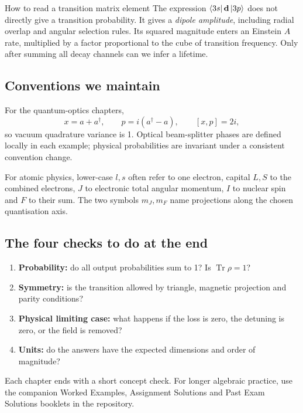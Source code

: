 \begin{worked}{How to read a transition matrix element}
The expression
\(\left\langle 3s\right\rvert\mathbf d\left\lvert 3p\right\rangle\)
does not directly give a transition
probability. It gives a \emph{dipole
amplitude}, including radial overlap
and angular selection rules.
Its squared magnitude enters an
Einstein \(A\) rate, multiplied by
a factor proportional to
the cube of transition frequency.
Only after summing all decay
channels can we infer a lifetime.
\end{worked}

\subsection*{Conventions we maintain}
For the quantum-optics chapters,
\[
x=a+a^\dagger,\qquad
p=i(a^\dagger-a),\qquad
[x,p]=2i,
\]
so vacuum quadrature variance is 1.
Optical beam-splitter phases are
defined locally in each example;
physical probabilities are invariant
under a consistent convention change.

For atomic physics, lower-case \(l,s\)
often refer to one electron, capital
\(L,S\) to the combined electrons,
\(J\) to electronic total angular
momentum, \(I\) to nuclear spin and
\(F\) to their sum. The two symbols
\(m_J,m_F\) name projections along
the chosen quantisation axis.

\subsection*{The four checks to do at the end}
\begin{enumerate}
\item \textbf{Probability:} do all output
probabilities sum to 1? Is \(\operatorname{Tr}\rho=1\)?
\item \textbf{Symmetry:} is the transition
allowed by triangle, magnetic projection
and parity conditions?
\item \textbf{Physical limiting case:}
what happens if the loss is zero,
the detuning is zero, or the field is removed?
\item \textbf{Units:} do the answers have the
expected dimensions and order of magnitude?
\end{enumerate}
Each chapter ends with a short concept
check. For longer algebraic practice,
use the companion Worked Examples,
Assignment Solutions and Past Exam
Solutions booklets in the repository.

